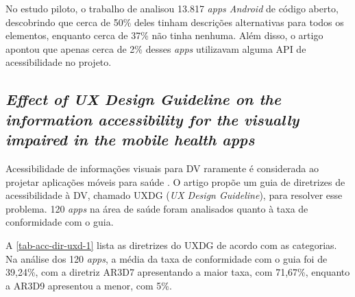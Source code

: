 No estudo piloto, o trabalho de  analisou 13.817 \emph{apps Android} de código aberto, descobrindo que cerca de 50\% deles tinham descrições alternativas para todos os elementos, enquanto cerca de 37\% não tinha nenhuma.
Além disso, o artigo apontou que apenas cerca de 2\% desses \emph{apps} utilizavam alguma API de acessibilidade no projeto.

\subsection{\emph{Effect of UX Design Guideline on the information accessibility for the visually impaired in the mobile health apps}}

Acessibilidade de informações visuais para DV raramente é considerada ao projetar aplicações móveis para saúde \cite{Kim20191103}.
O artigo propõe um guia de diretrizes de acessibilidade à DV, chamado UXDG (\emph{UX Design Guideline}), para resolver esse problema.
120 \emph{apps} na área de saúde foram analisados quanto à taxa de conformidade com o guia.

A \autoref{tab-acc-dir-uxd-1} lista as diretrizes do UXDG de acordo com as categorias.
Na análise dos 120 \emph{apps}, a média da taxa de conformidade com o guia foi de 39,24\%, com a diretriz AR3D7 apresentando
a maior taxa, com 71,67\%, enquanto a AR3D9 apresentou a menor, com 5\%.

